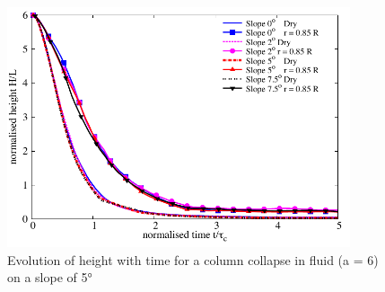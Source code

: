 \begin{figure}[htpb]
\centering
\includegraphics[width=0.9\textwidth]{Height_a6_slope}
\caption{Evolution of height with time for a column collapse in fluid (a = 6) 
on a slope of 5\si{\degree}}
\label{fig:Height_a6_slope}
\end{figure}


